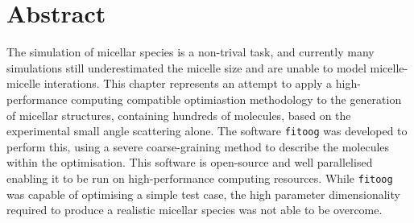 \section*{Abstract}
The simulation of micellar species is a non-trival task, and currently many simulations still underestimated the micelle size and are unable to model micelle-micelle interations.
This chapter represents an attempt to apply a high-performance computing compatible optimiastion methodology to the generation of micellar structures, containing hundreds of molecules, based on the experimental small angle scattering alone.
The software \texttt{fitoog} was developed to perform this, using a severe coarse-graining method to describe the molecules within the optimisation.
This software is open-source and well parallelised enabling it to be run on high-performance computing resources.
While \texttt{fitoog} was capable of optimising a simple test case, the high parameter dimensionality required to produce a realistic micellar species was not able to be overcome. 
